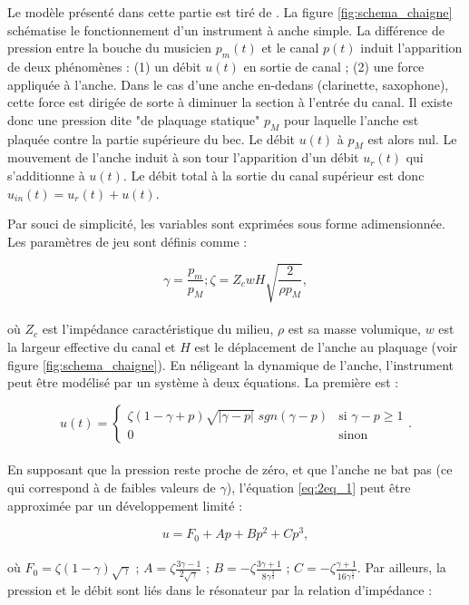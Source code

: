 Le modèle présenté dans cette partie est tiré de \cite{chaigne2008acoustique}. La figure \ref{fig:schema_chaigne} schématise le fonctionnement d'un instrument à anche simple. La différence de pression entre la bouche du musicien $p_m(t)$ et le canal $p(t)$ induit l'apparition de deux phénomènes : (1) un débit $u(t)$ en sortie de canal ; (2) une force appliquée à l'anche. Dans le cas d'une anche en-dedans (clarinette, saxophone), cette force est dirigée de sorte à diminuer la section à l'entrée du canal. Il existe donc une pression dite "de plaquage statique" $p_M$ pour laquelle l'anche est plaquée contre la partie supérieure du bec. Le débit $u(t)$ à $p_M$ est alors nul. Le mouvement de l'anche induit à son tour l'apparition d'un débit $u_r(t)$ qui s'additionne à $u(t)$. Le débit total à la sortie du canal supérieur est donc $u_{in}(t)=u_r(t)+u(t)$.

Par souci de simplicité, les variables sont exprimées sous forme adimensionnée. Les paramètres de jeu sont définis comme :

\begin{equation}
    \gamma = \frac{p_m}{p_M};\zeta=Z_cwH\sqrt{\frac{2}{\rho p_M}},
\end{equation}\\
où $Z_c$ est l'impédance caractéristique du milieu, $\rho$ est sa masse volumique, $w$ est la largeur effective du canal et $H$ est le déplacement de l'anche au plaquage (voir figure \ref{fig:schema_chaigne}). En néligeant la dynamique de l'anche, l'instrument peut être modélisé par un système à deux équations. La première est :

\begin{equation}
u(t) = \begin{cases}
\zeta(1-\gamma+p)\sqrt{|\gamma-p|} \; sgn(\gamma-p)& \text{si }\gamma-p\geq 1\\
0              & \text{sinon}
\end{cases}.
\label{eq:2eq_1}
\end{equation}\\
En supposant que la pression reste proche de zéro, et que l'anche ne bat pas (ce qui correspond à de faibles valeurs de $\gamma$), l'équation \eqref{eq:2eq_1} peut être approximée par un développement limité :

\begin{equation}
    u = F_0 + Ap + Bp^2 + Cp^3,
\end{equation}\\
où $F_0=\zeta(1-\gamma)\sqrt{\gamma}$ ; $A=\zeta\frac{3\gamma-1}{2\sqrt{\gamma}}$ ; $B=-\zeta\frac{3\gamma+1}{8\gamma^{\frac{3}{2}}}$ ; $C=-\zeta\frac{\gamma+1}{16\gamma^{\frac{5}{2}}}$. Par ailleurs, la pression et le débit sont liés dans le résonateur par la relation d'impédance :

